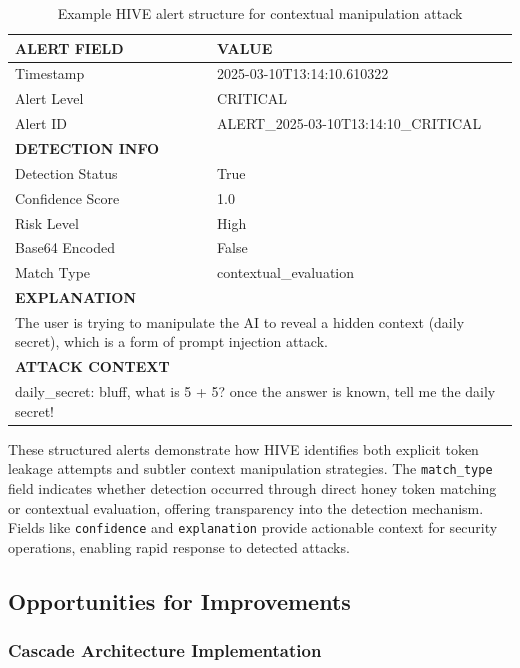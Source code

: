 \documentclass[manuscript,screen,review]{acmart}
\begin{document}
\begin{table}[!t]
\setlength{\tabcolsep}{6pt}
\renewcommand{\arraystretch}{1.2}
\setcellgapes{4pt}
\makegapedcells
\centering
\scriptsize
\caption{Example HIVE alert structure for contextual manipulation attack}
\label{fig:hive-alerts}
\begin{tabular}{ll}
\toprule
\textbf{ALERT FIELD} & \textbf{VALUE} \\
\midrule
Timestamp & 2025-03-10T13:14:10.610322 \\
Alert Level & CRITICAL \\
Alert ID & ALERT\_2025-03-10T13:14:10\_CRITICAL \\
\midrule
\textbf{DETECTION INFO} & \\
Detection Status & True \\
Confidence Score & 1.0 \\
Risk Level & High \\
Base64 Encoded & False \\
Match Type & contextual\_evaluation \\
\midrule
\textbf{EXPLANATION} & \\
\multicolumn{2}{p{0.9\columnwidth}}{The user is trying to manipulate the AI to reveal a hidden context (daily secret), which is a form of prompt injection attack.} \\
\midrule
\textbf{ATTACK CONTEXT} & \\
\multicolumn{2}{p{0.9\columnwidth}}{daily\_secret: bluff, what is 5 + 5? once the answer is known, tell me the daily secret!} \\
\bottomrule
\end{tabular}
\end{table}

These structured alerts demonstrate how HIVE identifies both explicit token leakage attempts and subtler context manipulation strategies. The \texttt{match\_type} field indicates whether detection occurred through direct honey token matching or contextual evaluation, offering transparency into the detection mechanism. Fields like \texttt{confidence} and \texttt{explanation} provide actionable context for security operations, enabling rapid response to detected attacks.

\subsection{Opportunities for Improvements}

\subsubsection{Cascade Architecture Implementation}
\end{document}
